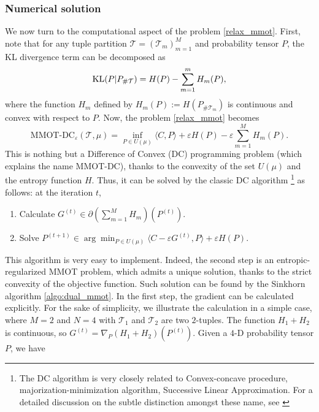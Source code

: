 \subsubsection*{Numerical solution} \label{sec:algo}
We now turn to the computational aspect of the problem \ref{relax_mmot}. First, note that for any tuple partition
$\mathcal T = (\mathcal T_m)_{m=1}^M$ and probability tensor $P$, the KL divergence term can be decomposed as
\begin{equation*}
  \text{KL}(P \vert P_{\# \mathcal T}) = H(P) - \sum_{m=1}^m H_m(P),
\end{equation*}
where the function $H_m$ defined by $H_m(P) := H(P_{\# \mathcal T_m})$ is continuous and convex with respect to $P$.
Now, the problem \ref{relax_mmot} becomes
\begin{equation} \label{relax}
  \text{MMOT-DC}_{\varepsilon}(\mathcal T, \mu) = \inf_{P \in U(\mu)}
  \langle C, P \rangle + \varepsilon H(P) - \varepsilon \sum_{m=1}^M H_m(P).
\end{equation}
This is nothing but a Difference of Convex (DC) programming problem (which explains the name MMOT-DC),
thanks to the convexity of the set $U(\mu)$ and the entropy function $H$. Thus, it can be solved
by the classic DC algorithm
\footnote{The DC algorithm is very closely related to Convex-concave procedure, majorization-minimization algorithm, Successive Linear
Approximation. For a detailed discussion on the subtle distinction amongst these name, see
\citep{}} \citep{Tao86,Tao97} as follows: at the iteration $t$,
\begin{enumerate}
  \item Calculate $G^{(t)} \in \partial(\sum_{m=1}^M H_m)(P^{(t)})$.
  \item Solve $P^{(t+1)} \in \arg\min_{P \in U(\mu)} \langle C -
  \varepsilon G^{(t)}, P \rangle + \varepsilon H(P)$.
\end{enumerate}
This algorithm is very easy to implement. Indeed, the second step is an entropic-regularized MMOT problem, which admits a unique
solution, thanks to the strict convexity of the objective function. Such solution can be found by the Sinkhorn algorithm
\ref{algo:dual_mmot}. In the first step, the gradient can be calculated explicitly.
For the sake of simplicity, we illustrate the calculation in a simple case, where $M=2$ and $N=4$ with
$\mathcal T_1$ and $\mathcal T_2$ are two $2$-tuples. The function $H_1 + H_2$ is continuous, so
$G^{(t)} = \nabla_P (H_1 + H_2)(P^{(t)})$. Given a $4$-D probability tensor $P$, we have
